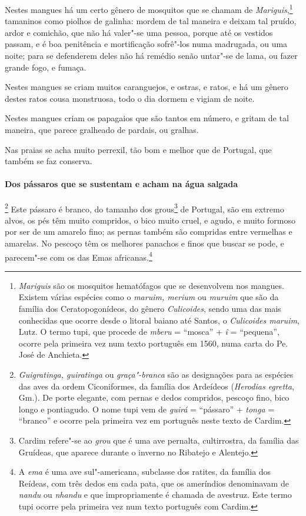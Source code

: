 \begin{linenumbers}
 Nestes mangues há um certo gênero de mosquitos que se chamam de
\textit{Mariguis},\footnote{ \textit{Mariguis} são os mosquitos
hematófagos que se desenvolvem nos mangues. Existem várias espécies
como o \textit{maruim, merium} ou \textit{muruim} que são da família
dos Ceratopogonídeos, do gênero \textit{Culicoides}, sendo uma das mais
conhecidas que ocorre desde o litoral baiano até Santos, o
\textit{Culicoides maruim}, Lutz. O termo tupi, que procede de
\textit{mberu} = ``mosca'' + \textit{î} = ``pequena'', ocorre pela primeira
vez num texto português em 1560, numa carta do Pe. José de
Anchieta.} tamaninos como piolhos de galinha: mordem de tal maneira e
deixam tal pruído, ardor e comichão, que não há valer"-se uma pessoa,
porque até os vestidos passam, e é boa penitência e mortificação
sofrê"-los numa madrugada, ou uma noite; para se defenderem deles não há
remédio senão untar"-se de lama, ou fazer grande fogo, e fumaça.

 Nestes mangues se criam muitos caranguejos, e ostras, e ratos, e há um
gênero destes ratos cousa monstruosa, todo o dia dormem e vigiam de noite.

 Nestes mangues criam os papagaios que são tantos em número, e gritam de
tal maneira, que parece gralheado de pardais, ou gralhas.

 Nas praias se acha muito perrexil, tão bom e melhor que de Portugal, 
que também se faz conserva.


\paragraph{Dos pássaros que se sustentam e acham na água salgada}\quad
{}\footnote{ \textit{Guigratinga,
guiratinga} ou \textit{graça"-branca} são as designações para as
espécies das aves da ordem Ciconiformes, da família dos Ardeídeos
(\textit{Herodias egretta}, Gm.). De porte elegante, com pernas e dedos
compridos, pescoço fino, bico longo e pontiagudo. O nome tupi vem de
\textit{guirá} = ``pássaro'' + \textit{tonga} = ``branco'' e ocorre pela
primeira vez em português neste texto de Cardim.} Este
pássaro é branco, do tamanho dos grous\footnote{ Cardim refere"-se ao
\textit{grou} que é uma ave pernalta, cultirrostra, da família das
Gruídeas, que aparece durante o inverno no Ribatejo e Alentejo.} de
Portugal, são em extremo alvos, os pés têm muito compridos, o bico
muito cruel, e agudo, e muito formoso por ser de um amarelo fino; as
pernas também são compridas entre vermelhas e amarelas. No pescoço têm
os melhores panachos e finos que buscar se pode, e parecem"-se com os
das Emas africanas.\footnote{ A \textit{ema} é uma ave sul"-americana,
subclasse dos ratites, da família dos Reídeas, com três dedos em cada
pata, que os ameríndios denominavam de \textit{nandu} ou
\textit{nhandu} e que impropriamente é chamada de avestruz. Este termo
tupi ocorre pela primeira vez num texto português com Cardim.} 


\end{linenumbers}
